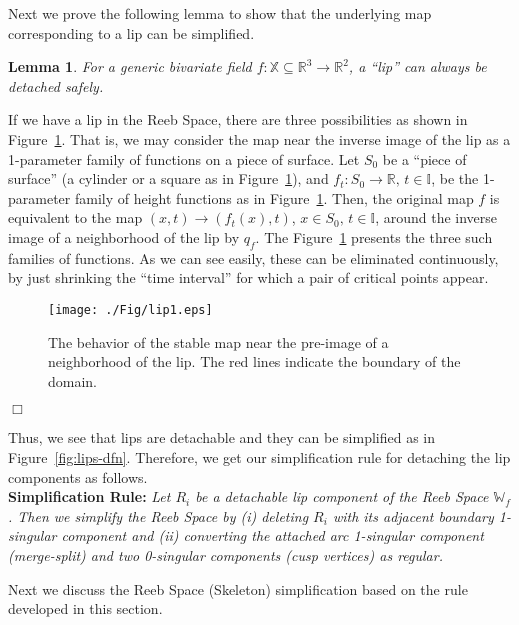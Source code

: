 \documentclass[twocolumn]{article}
\newtheorem{lemma}[theorem]{Lemma}
\newcommand{\I}{\mathbb{I}}
\newcommand{\X}{\mathbb{X}}
\newcommand{\R}{\mathbb{R}}
\newcommand{\RS}{\mathbb{W}_f}
\renewenvironment{proof}{{\bf Proof. }}{\hspace*{\fill}$\Box$\bigskip\noindent}
\begin{document}
\noindent
Next we prove the following lemma to show that the underlying map
corresponding to a lip can be simplified.
\begin{lemma}
\label{lem:detachability}
For a generic bivariate field $f: \X\subseteq \R^3\rightarrow\R^2$, a  ``lip'' can always be detached safely.
\end{lemma}
\noindent
\begin{proof}
If we have a lip in the Reeb Space, there are
three possibilities as shown in Figure~\ref{fig:lips}.
That is, we may consider the map near the inverse image of
the lip as a 1-parameter family of functions on a piece of surface.
Let $S_0$ be a ``piece of surface'' (a cylinder or a square as in Figure~\ref{fig:lips}),
and $f_t : S_0 \rightarrow \R,\, t \in \I$, 
be the 1-parameter family of height functions as in Figure~\ref{fig:lips}. 
Then, the original map $f$ is equivalent to the map $(x, t) \rightarrow
(f_t(x), t)$, $x \in S_0,\, t \in \I$, around the inverse image of a neighborhood of the lip by $q_f$. 
The Figure~\ref{fig:lips} presents the three such families of functions.
As we can see easily, these can be eliminated continuously,
by just shrinking the ``time interval'' for which a pair
of critical points appear.
\begin{figure}[h!]
\begin{center}
\texttt{[image: ./Fig/lip1.eps]}
\caption{The behavior of the stable map
  near the pre-image of a neighborhood of the lip. The red lines indicate the boundary of the domain.}
\label{fig:lips}
\end{center}
\end{figure} 
\end{proof}


\noindent
Thus, we see that lips are detachable and they can be simplified as in
Figure~\ref{fig:lips-dfn}. Therefore, we get our simplification rule for
detaching the lip components
as follows.\\

\noindent
\textbf{Simplification Rule:}
\emph{
Let $R_i$ be a detachable lip component of the Reeb
Space $\RS$. Then we simplify the Reeb Space by (i) deleting $R_i$ with
its adjacent boundary 1-singular component and
(ii) converting the attached arc 1-singular component (merge-split)
and two 0-singular components (cusp vertices) as regular.}

Next we discuss the Reeb Space (Skeleton) simplification based on the
rule developed in this section.
\end{document}
